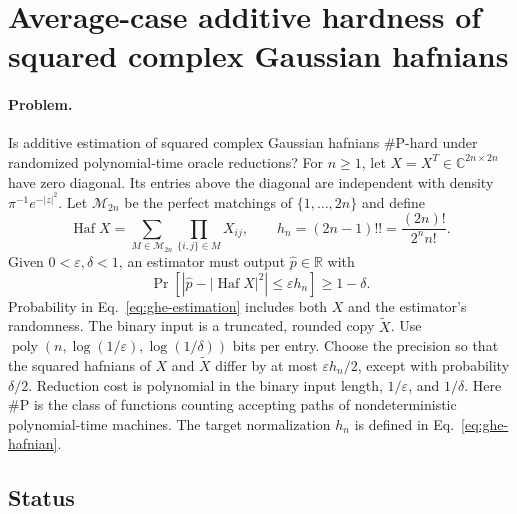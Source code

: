 \section{Average-case additive hardness of squared complex Gaussian hafnians}
\label{sec:op_903c729ed6eb9ce6}

\paragraph{Problem.}
Is additive estimation of squared complex Gaussian hafnians $\#\mathrm P$-hard under randomized polynomial-time oracle reductions?
For $n\geq1$, let $X=X^T\in\mathbb C^{2n\times2n}$ have zero diagonal.
Its entries above the diagonal are independent with density $\pi^{-1}e^{-|z|^2}$.
Let $\mathcal M_{2n}$ be the perfect matchings of $\{1,\ldots,2n\}$ and define
\begin{equation}
 \operatorname{Haf}X=\sum_{M\in\mathcal M_{2n}}\prod_{\{i,j\}\in M}X_{ij},
 \qquad h_n=(2n-1)!!=\frac{(2n)!}{2^n n!}.
 \label{eq:ghe-hafnian}
\end{equation}
Given $0<\varepsilon,\delta<1$, an estimator must output $\widehat p\in\mathbb R$ with
\begin{equation}
 \Pr\!\left[\left|\widehat p-|\operatorname{Haf}X|^2\right|
                   \leq\varepsilon h_n\right]\geq1-\delta.
 \label{eq:ghe-estimation}
\end{equation}
Probability in Eq.~\eqref{eq:ghe-estimation} includes both $X$ and the estimator's randomness.
The binary input is a truncated, rounded copy $\widetilde X$.
Use $\operatorname{poly}(n,\log(1/\varepsilon),\log(1/\delta))$ bits per entry.
Choose the precision so that the squared hafnians of $X$ and $\widetilde X$ differ by at most $\varepsilon h_n/2$, except with probability $\delta/2$.
Reduction cost is polynomial in the binary input length, $1/\varepsilon$, and $1/\delta$.
Here $\#\mathrm P$ is the class of functions counting accepting paths of nondeterministic polynomial-time machines.
The target normalization $h_n$ is defined in Eq.~\eqref{eq:ghe-hafnian}.

\subsection*{Status}


